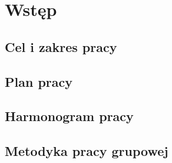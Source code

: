 \newpage\section{Wstęp}\label{sec:wstep}
 
\subsection{Cel i zakres pracy}

\subsection{Plan pracy}

\subsection{Harmonogram pracy}

\subsection{Metodyka pracy grupowej}

 

